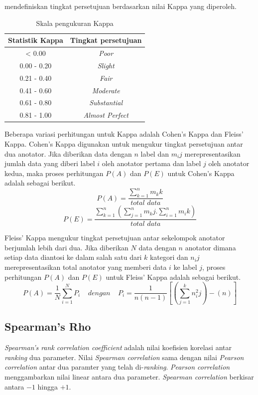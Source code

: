 \noindent \cite{landis1977measurement} mendefiniskan tingkat persetujuan berdasarkan nilai Kappa yang diperoleh. 
\begin{table}
  \centering
    \caption{Skala pengukuran Kappa}
    \label{table:skalaKappa}
    \begin{tabular}{|c|c|}
      \hline
      Statistik Kappa & Tingkat persetujuan \\ \hline
      < 0.00 & \textit{Poor} \\ \hline
      0.00 - 0.20 & \textit{Slight} \\ \hline
      0.21 - 0.40 & \textit{Fair} \\ \hline
      0.41 - 0.60 & \textit{Moderate} \\ \hline
      0.61 - 0.80 & \textit{Substantial} \\ \hline
      0.81 - 1.00 & \textit{Almost Perfect} \\ \hline
    \end{tabular}
\end{table}

Beberapa variasi perhitungan untuk Kappa adalah Cohen's Kappa dan Fleiss' Kappa. Cohen's Kappa digunakan untuk mengukur tingkat persetujuan antar dua anotator. Jika diberikan data dengan $n$ label dan $m_ij$ merepresentasikan jumlah data yang diberi label $i$ oleh anotator pertama dan label $j$ oleh anotator kedua, maka proses perhitungan $P(A)$ dan $P(E)$ untuk Cohen's Kappa adalah sebagai berikut.
\[ P(A)=\frac{\sum_{k=1}^{n} m_kk}{total\,\,data} \]
\[ P(E)=\frac{\sum_{k=1}^{n} ( \sum_{j=1}^{n} m_kj . \sum_{i=1}^{n} m_ik ) }{total\,\,data} \]

Fleiss' Kappa mengukur tingkat persetujuan antar sekelompok anotator berjumlah lebih dari dua. Jika diberikan $N$ data dengan $n$ anotator dimana setiap data diantosi ke dalam salah satu dari $k$ kategori dan $n_ij$ merepresentasikan total anotator yang memberi data $i$ ke label $j$, proses perhitungan $P(A)$ dan $P(E)$ untuk Fleiss' Kappa adalah sebagai berikut.
\[ P(A)=\frac{1}{N}\sum_{i=1}^{N}P_i \:\:\:\:\:dengan\:\:\:\:\: P_i=\frac{1}{n(n-1)}[(\sum_{j=1}^{k}n^2_ij)-(n)] \]

\subsection{Spearman's Rho}
\textit{Spearman's rank correlation coefficient} adalah nilai koefisien korelasi antar \textit{ranking} dua parameter. Nilai \textit{Spearman correlation} sama dengan nilai \textit{Pearson correlation} antar dua paramter yang telah di-\textit{ranking}. \textit{Pearson correlation}  menggambarkan nilai linear antara dua parameter. \textit{Spearman correlation} berkisar antara $-1$ hingga $+1$.

